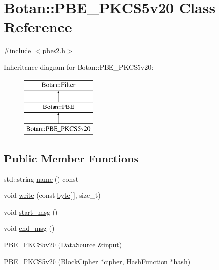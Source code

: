 \hypertarget{classBotan_1_1PBE__PKCS5v20}{\section{Botan\-:\-:P\-B\-E\-\_\-\-P\-K\-C\-S5v20 Class Reference}
\label{classBotan_1_1PBE__PKCS5v20}
}


{\ttfamily \#include $<$pbes2.\-h$>$}

Inheritance diagram for Botan\-:\-:P\-B\-E\-\_\-\-P\-K\-C\-S5v20\-:\begin{figure}[H]
\begin{center}
\leavevmode
\includegraphics[height=3.000000cm]{classBotan_1_1PBE__PKCS5v20}
\end{center}
\end{figure}
\subsection*{Public Member Functions}
\begin{DoxyCompactItemize}
\item 
std\-::string \hyperlink{classBotan_1_1PBE__PKCS5v20_a474c917227adc649c339690f23e1b82e}{name} () const 
\item 
void \hyperlink{classBotan_1_1PBE__PKCS5v20_a9b1c2571eb21f3c2810f7261a139fcaf}{write} (const \hyperlink{namespaceBotan_a7d793989d801281df48c6b19616b8b84}{byte}\mbox{[}$\,$\mbox{]}, size\-\_\-t)
\item 
void \hyperlink{classBotan_1_1PBE__PKCS5v20_afd666084f2ee950d5b73751bca66f726}{start\-\_\-msg} ()
\item 
void \hyperlink{classBotan_1_1PBE__PKCS5v20_a8eb45326e180cd6807b01abb3e477345}{end\-\_\-msg} ()
\item 
\hyperlink{classBotan_1_1PBE__PKCS5v20_a8a9e2b6fd82c3ff89dafb8afebe6fc3d}{P\-B\-E\-\_\-\-P\-K\-C\-S5v20} (\hyperlink{classBotan_1_1DataSource}{Data\-Source} \&input)
\item 
\hyperlink{classBotan_1_1PBE__PKCS5v20_a1596ca78acad9bc84a17ad6ce8c4e276}{P\-B\-E\-\_\-\-P\-K\-C\-S5v20} (\hyperlink{classBotan_1_1BlockCipher}{Block\-Cipher} $\ast$cipher, \hyperlink{classBotan_1_1HashFunction}{Hash\-Function} $\ast$hash)
\end{DoxyCompactItemize}
